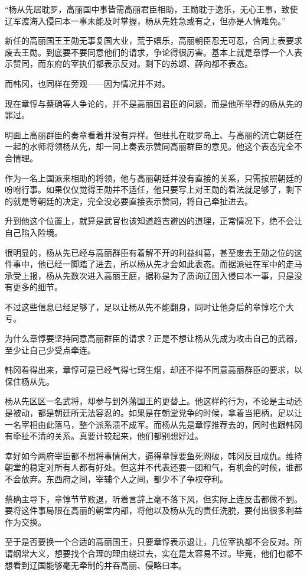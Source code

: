 “杨从先居耽罗，高丽国中事皆需高丽君臣相助，王勋耽于逸乐，无心王事，致使辽军渡海入侵曰本一事未能及时掌握，杨从先姓急或有之，但亦是人情难免。”

新任的高丽国王王勋无事复国大业，荒于嬉乐，高丽朝臣忍无可忍，合同上表要求废去王勋。到底要不要同意他们的请求，争论得很厉害。基本上就是章惇一个人表示赞同，而东府的宰执们都表示反对。剩下的苏颂、薛向都不表态。

而韩冈，也同样在旁观——因为情况并不对。

现在章惇与蔡确等人争论的，并不是高丽国君臣的问题，而是他所举荐的杨从先的罪过。

明面上高丽群臣的奏章看着并没有异样。但驻扎在耽罗岛上、与高丽的流亡朝廷在一起的水师将领杨从先，却一同上奏表示赞同高丽群臣的意见。他这个表态完全不合情理。

作为一名上国派来相助的将领，他与高丽朝廷并没有直接的关系，只需按照朝廷的吩咐行事。如果仅仅觉得王勋并不适任，他只要写上对王勋的看法就足够了，剩下的就是等朝廷的决定，完全没必要直接表示赞同，将自己牵扯进去。

升到他这个位置上，就算是武官也该知道趋吉避凶的道理，正常情况下，绝不会让自己陷入险境。

很明显的，杨从先已经与高丽群臣有着解不开的利益纠葛，甚至废去王勋之位的这件事中，他已经一脚踏了进去，所以杨从先才会如此表态。而据派驻在军中的走马承受上报，杨从先数次进入高丽王庭，据称是为了质询辽国入侵曰本一事，只是没有更多的细节。

不过这些信息已经足够了，足以让杨从先不能翻身，同时让他身后的章惇吃个大亏。

为什么章惇要坚持同意高丽群臣的请求？正是不想让杨从先成为攻击自己的武器，至少让自己少受点牵连。

韩冈看得出来，章惇可是已经气得七窍生烟，却还不得不同意高丽群臣的要求，以保住杨从先。

杨从先区区一名武将，却参与到外藩国王的更替上。他这样的行为，不论是主动还是被动，都是朝廷所无法容忍的。如果是在朝堂党争的时候，拿着当把柄，足以让一名宰相由此落马，整个派系溃不成军。而杨从先是章惇推荐去的，同时也跟韩冈有牵扯不清的关系。真要计较起来，他们都别想好过。

幸好如今两府宰臣都不想将事情闹大，逼得章惇要鱼死网破，韩冈反目成仇。维持朝堂的稳定对所有人都有好处。但这并不代表还要一团和气，有机会的时候，谁都不会放弃。东西府之间，宰辅个人之间，都少不了争权夺利。

蔡确主导下，章惇节节败退，听着言辞上毫不落下风，但实际上连反击都做不到。要将这件事局限在高丽的朝堂内部，将他以及杨从先的责任洗脱，要付出很多利益作为交换。

至于是否要换一个合适的高丽国王，只要章惇表示退让，几位宰执都不会反对。所谓纲常大义，想要找个合理的理由绕过去，实在是太容易不过。毕竟，他们也都不想看到辽国能够毫无牵制的并吞高丽、侵略曰本。

